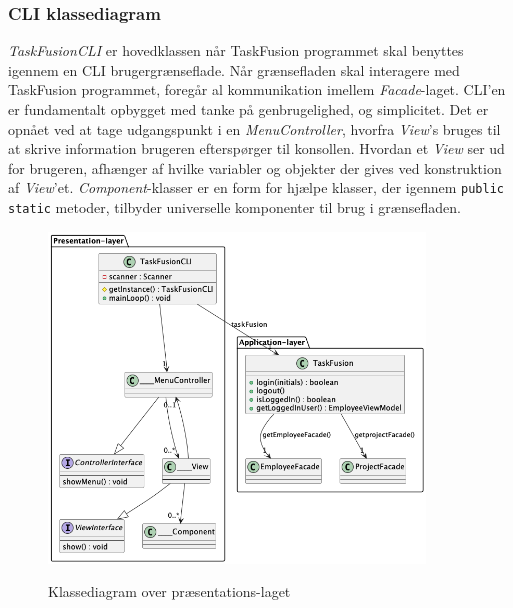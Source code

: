 \subsubsection{CLI klassediagram}
\textit{TaskFusionCLI} er hovedklassen når TaskFusion programmet skal benyttes igennem en CLI brugergrænseflade. Når grænsefladen skal interagere med TaskFusion programmet, foregår al kommunikation imellem \textit{Facade}-laget. CLI'en er fundamentalt opbygget med tanke på genbrugelighed, og simplicitet. Det er opnået ved at tage udgangspunkt i en \textit{MenuController}, hvorfra \textit{View}'s bruges til at skrive information brugeren efterspørger til konsollen. Hvordan et \textit{View} ser ud for brugeren, afhænger af hvilke variabler og objekter der gives ved konstruktion af \textit{View}'et. \textit{Component}-klasser er en form for hjælpe klasser, der igennem \texttt{public static} metoder, tilbyder universelle komponenter til brug i grænsefladen.

\begin{figure}[H]
    \centering
    \caption{Klassediagram over præsentations-laget}
    \includegraphics[width = 10cm, keepaspectratio]{TaskFusion/out/assets/diagrams/class_cli/TaskFusion-CLI.png}
    \label{fig:class_cli}
\end{figure}

